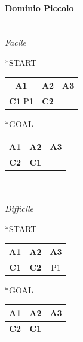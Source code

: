 \documentclass[a4paper,oneside,12pt]{book}
\begin{document}
    \paragraph*{Dominio Piccolo\\\\}
    \noindent \textit{Facile\\}
    \begin{minipage}{0.45\textwidth}
        \begin{center}
            *{START}
            \begin{tabular}{|c | c| c |}
                \hline
                A1&A2&A3\\
                \hline
                \textbf{C1} P1&\textbf{C2}&\\
                \hline
            \end{tabular}
        \end{center}
    \end{minipage}%
    \begin{minipage}{0.45\textwidth}
        \begin{center}
            *{GOAL}
            \begin{tabular}{|c | c| c |}
                \hline
                A1&A2&A3\\
                \hline
                \textbf{C2}&\textbf{C1}&\\
                \hline
            \end{tabular}
        \end{center}
    \end{minipage}%

    \noindent \textit{ \\\\ Difficile\\}
    \begin{minipage}{0.45\textwidth}
        \begin{center}
            *{START}
            \begin{tabular}{|c | c| c |}
                \hline
                A1&A2&A3\\
                \hline
                \textbf{C1} &\textbf{C2}&P1\\
                \hline
            \end{tabular}
        \end{center}
    \end{minipage}%
    \begin{minipage}{0.45\textwidth}

        \begin{center}
            *{GOAL}
            \begin{tabular}{|c | c| c |}
                \hline
                A1&A2&A3\\
                \hline
                \textbf{C2}&\textbf{C1}&\\
                \hline
            \end{tabular}

        \end{center}
    \end{minipage}
\end{document}

